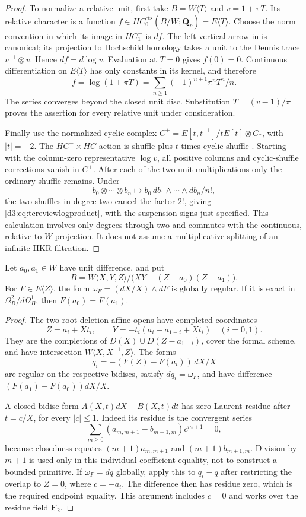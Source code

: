 \begin{proof}
To normalize a relative unit, first take $B=W\langle T\rangle$ and
$v=1+\pi T$. Its relative character is a function
$f\in HC_0^{\mathrm{cts}}(B/W;\mathbf Q_p)=E\langle T\rangle$.
Choose the norm convention in which its image in $HC^-_1$ is $df$.
The left vertical arrow in \cite[Theorem~2.12]{AMMN} is canonical;
its projection to Hochschild homology takes a unit to the Dennis trace
$v^{-1}\otimes v$. Hence $df=d\log v$. Evaluation at $T=0$ gives
$f(0)=0$. Continuous differentiation on $E\langle T\rangle$ has
only constants in its kernel, and therefore
\[
 f=\log(1+\pi T)=\sum_{n\ge1}(-1)^{n+1}\pi^nT^n/n.
\]
The series converges beyond the closed unit disc. Substitution
$T=(v-1)/\pi$ proves the assertion for every relative unit under
consideration.

Finally use the normalized cyclic complex
$C^+=E[t,t^{-1}]/tE[t]\otimes C_*$, with $|t|=-2$.
The $HC^-\times HC$ action is shuffle plus $t$ times cyclic shuffle
\cite[Definition~2.1 and Remark~2.2]{BokstedtOttosen}.
Starting with the column-zero representative $\log v$, all positive
columns and cyclic-shuffle corrections vanish in $C^+$. After each
of the two unit multiplications only the ordinary shuffle remains.
Under
\[
 b_0\otimes\cdots\otimes b_n\longmapsto
       b_0\,db_1\wedge\cdots\wedge db_n/n!,
\]
the two shuffles in degree two cancel the factor $2!$, giving
\eqref{d3:eq:tcreviewlogproduct}, with the suspension signs just specified.
This calculation involves only degrees through two and commutes with
the continuous, relative-to-$W$ projection. It does not assume a
multiplicative splitting of an infinite HKR filtration.
\end{proof}

\begin{lemma}
\label{d3:lem:tcreviewresidue}
Let $a_0,a_1\in W$ have unit difference, and put
\[
 B=W\langle X,Y,Z\rangle/
           \bigl(XY+(Z-a_0)(Z-a_1)\bigr).
\]
For $F\in E\langle Z\rangle$, the form
$\omega_F=(dX/X)\wedge dF$ is globally regular. If it is exact in
$\Omega_B^2/d\Omega_B^1$, then $F(a_0)=F(a_1)$.
\end{lemma}
\begin{proof}
The two root-deletion affine opens have completed coordinates
\[
 Z=a_i+Xt_i,\qquad
 Y=-t_i(a_i-a_{1-i}+Xt_i)\quad(i=0,1).
\]
They are the completions of $D(X)\cup D(Z-a_{1-i})$, cover the formal
scheme, and have intersection $W\langle X,X^{-1},Z\rangle$.
The forms
\[
 q_i=-(F(Z)-F(a_i))\,dX/X
\]
are regular on the respective bidiscs, satisfy $dq_i=\omega_F$, and
have difference $(F(a_1)-F(a_0))dX/X$.

A closed bidisc form $A(X,t)dX+B(X,t)dt$ has zero Laurent residue
after $t=c/X$, for every $|c|\le1$. Indeed its residue is the
convergent series
\[
 \sum_{m\ge0}(a_{m,m+1}-b_{m+1,m})c^{m+1}=0,
\]
because closedness equates $(m+1)a_{m,m+1}$ and
$(m+1)b_{m+1,m}$. Division by $m+1$ is used only in this individual
coefficient equality, not to construct a bounded primitive.
If $\omega_F=dq$ globally, apply this to $q_i-q$ after restricting
the overlap to $Z=0$, where $c=-a_i$. The difference then has residue
zero, which is the required endpoint equality. This argument includes
$c=0$ and works over the residue field $\mathbf F_2$.
\end{proof}

